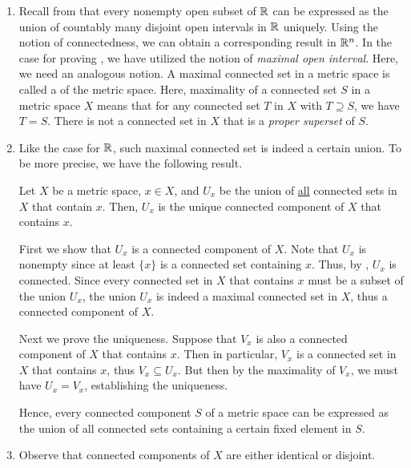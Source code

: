 \begin{enumerate}
\item Recall from  that every nonempty open subset
of \(\mathbb{R}\) can be expressed as the union of countably many disjoint open
intervals in \(\mathbb{R}\) uniquely. Using the notion of connectedness, we can obtain
a corresponding result in \(\mathbb{R}^n\). In the case for proving
, we have utilized the notion of \emph{maximal
open interval}. Here, we need an analogous notion. A maximal connected set in a
metric space is called a  of the metric space.
Here, maximality of a connected set \(S\) in a metric space \(X\) means that
for any connected set \(T\) in \(X\) with \(T\supseteq S\), we have \(T=S\).
There is not a connected set in \(X\) that is a \emph{proper superset} of
\(S\).


\item Like the case for \(\mathbb{R}\), such maximal connected set is indeed a certain
union. To be more precise, we have the following result.

\begin{proposition}
\label{prp:conn-comp-union}
Let \(X\) be a metric space, \(x\in X\), and \(U_x\) be the union of
\underline{all} connected sets in \(X\) that contain \(x\). Then, \(U_x\) is
the unique connected component of \(X\) that contains \(x\).
\end{proposition}
\begin{pf}
First we show that \(U_x\) is a connected component of \(X\). Note that \(U_x\)
is nonempty since at least \(\{x\}\) is a connected set containing \(x\). Thus,
by , \(U_x\) is connected. Since every
connected set in \(X\) that contains \(x\) must be a subset of the union
\(U_x\), the union \(U_x\) is indeed a maximal connected set in \(X\), thus a
connected component of \(X\).

Next we prove the uniqueness. Suppose that \(V_x\) is also a connected
component of \(X\) that contains \(x\). Then in particular, \(V_x\) is a
connected set in \(X\) that contains \(x\), thus \(V_x\subseteq U_x\). But then
by the maximality of \(V_x\), we must have \(U_x=V_x\), establishing the
uniqueness.
\end{pf}

Hence, every connected component \(S\) of a metric space can be expressed as
the union of all connected sets containing a certain fixed element in \(S\).

\item \label{it:conn-compo-ident-or-disjoint}
Observe that connected components of \(X\) are either identical or disjoint.


\end{enumerate}
